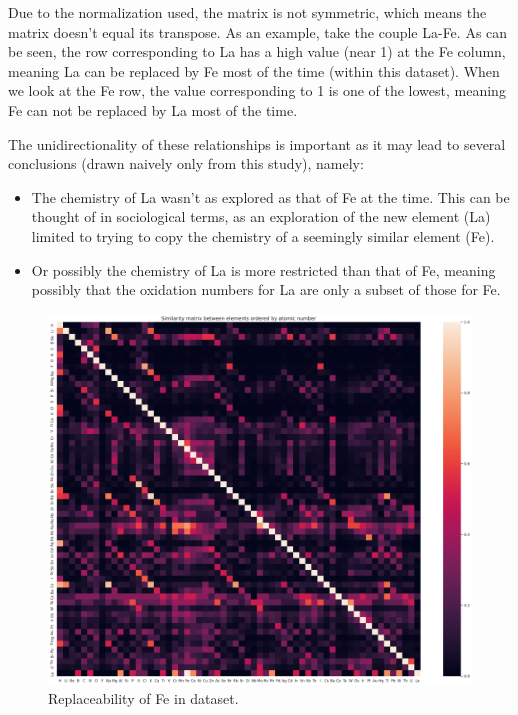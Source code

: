 \documentclass[]{article}
\begin{document}
Due to the normalization used, the matrix is not symmetric, which means the matrix doesn't equal its transpose. As an example, take the couple La-Fe. As can be seen, the row corresponding to La has a high value (near 1) at the Fe column, meaning La can be replaced by Fe most of the time (within this dataset). When we look at the Fe row, the value corresponding to 1 is one of the lowest, meaning Fe can not be replaced by La most of the time. 

The unidirectionality of these relationships is important as it may lead to several conclusions (drawn naively only from this study), namely:

\begin{itemize}
	\item The chemistry of La wasn't as explored as that of Fe at the time. This can be thought of in sociological terms, as an exploration of the new element (La) limited to trying to copy the chemistry of a seemingly similar element (Fe).
	\item Or possibly the chemistry of La is more restricted than that of Fe, meaning possibly that the oxidation numbers for La are only a subset of those for Fe.
\end{itemize}

\begin{figure}[h!]
  \centering
	\includegraphics[width=18.0cm]{matrix.png}
	\caption{Replaceability of Fe in dataset.}
	\label{fig:fig5}
\end{figure}
\end{document}
